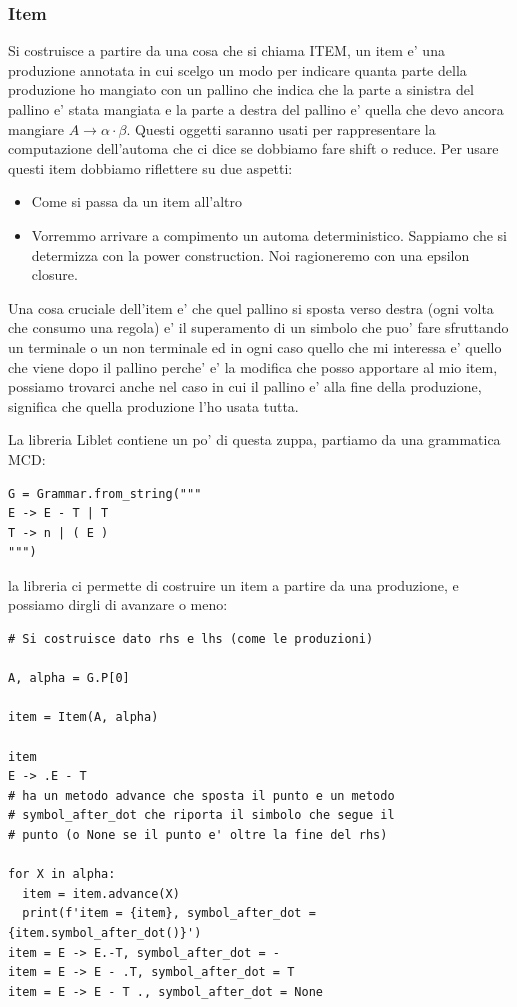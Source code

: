 \subsubsection{Item}
Si costruisce a partire da una cosa che si chiama ITEM, un item e' una produzione annotata in cui scelgo un modo per indicare quanta parte della produzione ho mangiato con un pallino che indica che la parte a sinistra del pallino e' stata mangiata e la parte a destra del pallino e' quella che devo ancora mangiare $A \rightarrow \alpha \cdot \beta$.
Questi oggetti saranno usati per rappresentare la computazione dell'automa che ci dice se dobbiamo fare shift o reduce. Per usare questi item dobbiamo riflettere su due aspetti:
\begin{itemize}
  \item Come si passa da un item all'altro
  \item Vorremmo arrivare a compimento un automa deterministico. Sappiamo che si determizza con la power construction. Noi ragioneremo con una epsilon closure.
\end{itemize}

Una cosa cruciale dell'item e' che quel pallino si sposta verso destra (ogni volta che consumo una regola) e' il superamento di un simbolo che puo' fare sfruttando un terminale o un non terminale ed in ogni caso quello che mi interessa e' quello che viene dopo il pallino perche' e' la modifica che posso apportare al mio item, possiamo trovarci anche nel caso in cui il pallino e' alla fine della produzione, significa che quella produzione l'ho usata tutta.

La libreria Liblet contiene un po' di questa zuppa, partiamo da una grammatica MCD:
\begin{lstlisting}
G = Grammar.from_string("""
E -> E - T | T
T -> n | ( E )
""")
\end{lstlisting}

la libreria ci permette di costruire un item a partire da una produzione, e possiamo dirgli di avanzare o meno:
\begin{lstlisting}
# Si costruisce dato rhs e lhs (come le produzioni)

A, alpha = G.P[0]

item = Item(A, alpha)

item
E -> .E - T
# ha un metodo advance che sposta il punto e un metodo
# symbol_after_dot che riporta il simbolo che segue il 
# punto (o None se il punto e' oltre la fine del rhs)

for X in alpha:
  item = item.advance(X)
  print(f'item = {item}, symbol_after_dot = {item.symbol_after_dot()}')
item = E -> E.-T, symbol_after_dot = -
item = E -> E - .T, symbol_after_dot = T
item = E -> E - T ., symbol_after_dot = None
\end{lstlisting}

